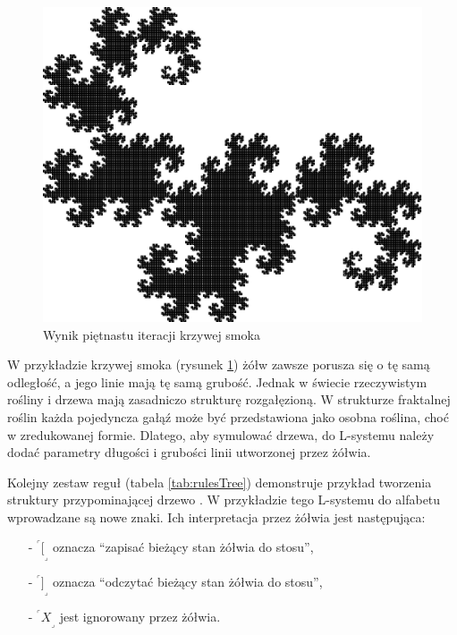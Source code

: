 \documentclass[a4paper,twoside,12pt]{report}
\def\crnrs#1{$^\ulcorner#1_\lrcorner$}
\begin{document}
\begin{figure}[H]
	\centering
	\includegraphics[scale=0.8]{grafika/example152}
	\caption{Wynik piętnastu iteracji krzywej smoka}
	\label{fig:dragoncurve}
\end{figure}

W przykładzie krzywej smoka (rysunek \ref{fig:dragoncurve}) żółw zawsze
porusza się o tę samą odległość, a jego linie mają tę samą grubość.
Jednak w świecie rzeczywistym rośliny
i drzewa mają zasadniczo strukturę rozgałęzioną. W strukturze fraktalnej
roślin każda pojedyncza gałąź może być przedstawiona jako osobna roślina,
choć w zredukowanej formie. Dlatego, aby symulować drzewa, do L-systemu 
należy dodać parametry długości i grubości linii utworzonej przez 
żółwia. 

Kolejny zestaw reguł (tabela \ref{tab:rulesTree}) demonstruje przykład tworzenia struktury 
przypominającej drzewo \cite{beautyofplants}.
W przykładzie tego L-systemu do alfabetu wprowadzane są nowe znaki. 
Ich interpretacja przez żółwia jest następująca:

\begin{itemize}
	\setlength\itemsep{1em}
	\item[-] \crnrs{[} oznacza ``zapisać bieżący stan żółwia do stosu'',
	\item[-] \crnrs{]} oznacza ``odczytać bieżący stan żółwia do stosu'',
	\item[-] \crnrs{X} jest ignorowany przez żółwia.
\end{itemize}
\end{document}
